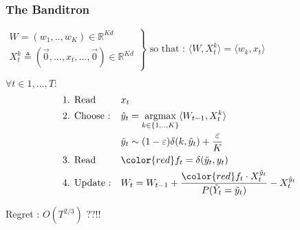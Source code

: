 \documentclass{beamer}
\begin{document}
\begin{frame}
	\frametitle{The Banditron \cite{kakade2008efficient}}
	\begin{small}
				\begin{exampleblock}{}
				$
				\left.
				\begin{array}{l}
				W = (w_1,..,w_K) \in \mathbb{R}^{K d}\\
				X_t^k \triangleq (\vec{0}, ...,  x_t, ..., \vec{0}) \in \mathbb{R}^{K d}
				\end{array}
				\right\}
				\text{ so that : }
				\langle W, X^k_t\rangle = \langle w_k, x_t\rangle
				$
				
			\end{exampleblock}
	\begin{block}{}
		$\forall t \in 1,...,T :$
		\begin{align*}
		&\text{1. Read } 
		&& x_t 
		\\
		&\text{2. Choose :} 
		&& \hat{y}_t = \underset{k \in\{1,..,K\}}{\text{argmax}}  \langle W_{t-1}, X_t^k \rangle 
		\\
		& %
		&& \tilde{y}_t \sim (1-\varepsilon) \delta(k,\hat{y}_t) + \frac{\varepsilon}{K} 
		\\	
		&\text{3. Read } 
		&& {\color{red} f_t = \delta(\tilde{y}_t ,y_t)}  
		\\
		&\text{4. Update :} 
		&& W_t = W_{t-1} + \frac{{\color{red}f_t}\cdot X_t^{\tilde{y}_t}}{P(\tilde{Y}_t=\tilde{y}_t)} - X_t^{\hat{y}_t} 
		\end{align*}
	\end{block}
		Regret : $O(T^{2/3})$ ??!!
	\end{small}

\end{frame}

\end{document}
